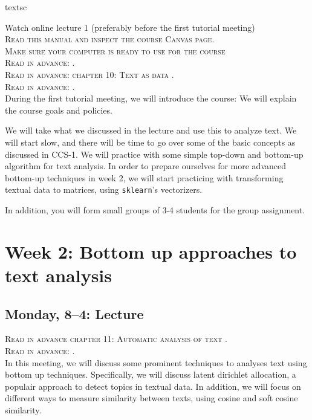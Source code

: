 textsc{ Watch online lecture 1 (preferably before the first tutorial meeting)\\
\textsc{ Read this manual and inspect the course Canvas page.}\\
\textsc{ Make sure your computer is ready to use for the course }\\
\textsc{ Read in advance: \cite{Hirschenberg2015}.} \\
\textsc{Read in advance: chapter 10: Text as data \cite{van_atteveldt_computational_2022}.} \\
\textsc{Read in advance: \cite{Boumans2016}.} \\

During the first tutorial meeting, we will introduce the course: We will explain the course goals and policies. 

We will take what we discussed in the lecture and use this to analyze text. We will start slow, and there will be time to go over some of the basic concepts as discussed in CCS-1. We will practice with some simple top-down and bottom-up algorithm for text analysis. In order to prepare ourselves for more advanced bottom-up techniques in week 2, we will start practicing with transforming textual data to matrices, using  \texttt{sklearn}'s vectorizers. 

In addition, you will form small groups of 3-4 students for the group assignment. 

\section*{Week 2:  Bottom up approaches to text analysis}

\subsection*{Monday, 8--4: Lecture}

\textsc{Read in advance chapter 11: Automatic analysis of text \cite{van_atteveldt_computational_2022}.} \\
\textsc{Read in advance: \cite{Brinberg2021}.} \\

In this meeting, we will discuss some prominent techniques to analyses text using bottom up techniques. Specifically, we will discuss latent dirichlet allocation, a populair approach to detect topics in textual data. In addition, we will focus on different ways to measure similarity between texts, using cosine and soft cosine similarity. 

}
